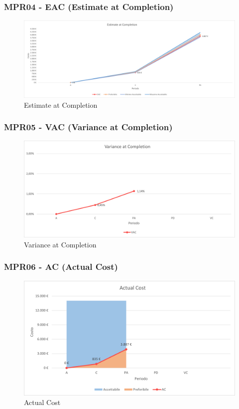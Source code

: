 \subsubsection{MPR04 - EAC (Estimate at Completion)}
\begin{figure}[!ht]
    \caption{Estimate at Completion}
    \vspace{10px}
    \includegraphics[scale=0.5]{sezioni/immagini/EstimateAtCompletion.png}
    \centering
\end{figure}
\subsubsection{MPR05 - VAC (Variance at Completion)}
\begin{figure}[!ht]
    \caption{Variance at Completion}
    \vspace{10px}
    \includegraphics[scale=0.5]{sezioni/immagini/VarianceAtCompletion.png}
    \centering
\end{figure}
\pagebreak
\subsubsection{MPR06 - AC (Actual Cost)}
\begin{figure}[!ht]
    \caption{Actual Cost}
    \vspace{10px}
    \includegraphics[scale=0.5]{sezioni/immagini/ActualCost.png}
    \centering
\end{figure}
